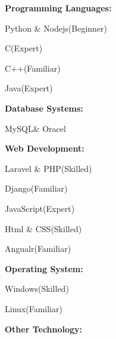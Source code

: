 

\begin{cventries}

\cventry
    {\textbf{ Programming Languages:}} %
    {} %
    {} %
    {} %
    {
      \begin{cvitems} %
       {\item {Python \& Nodejs(Beginner)}
        \item {C(Expert)}
        \item {C++(Familiar)}
        \item {Java(Expert)}
      }\end{cvitems}
    }
\cventry
    {\textbf{Database Systems:}} %
    {} %
    {} %
    {} %
    {
      \begin{cvitems} %
       {\item {MySQL\& Oracel}
      }\end{cvitems}
    }
\cventry
    {\textbf{Web Development:}} %
    {} %
    {} %
    {} %
    {
      \begin{cvitems} %
       {\item {Laravel \& PHP(Skilled)}
       \item{Django(Familiar)}
       \item {JavaScript(Expert)}
        \item {Html \& CSS(Skilled)}
       \item {Angualr(Familiar)}
      }\end{cvitems}
    }
\cventry
    {\textbf{Operating System:}} %
    {} %
    {} %
    {} %
    {
      \begin{cvitems} %
       {\item {Windows(Skilled)}
       \item{Linux(Familiar)}
      }\end{cvitems}
    }
\cventry
    {\textbf{Other Technology:}} %

\end{cventries}
